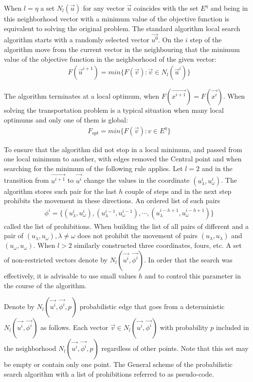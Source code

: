 \documentclass[]{TAACpaper}
\begin{document}
When $l=\eta$ a set $ N_l(\vec{u})$ for any vector $\vec{u}$ coincides with the set $E^{\eta}$ and being in this neighborhood vector with a minimum value of the objective function is equivalent to solving the original problem. The standard algorithm local search algorithm starts with a randomly selected vector $\vec{u^0}$.
On the $i$ step of the algorithm move from the current vector in the neighbouring that the minimum value of the objective function in the neighborhood of the given vector:
\begin{align} 
& F(\vec{u}^{i+1})=min\{F(\vec{v}):\vec{v} \in N_l(\vec{u}^i)\}
\end{align}	

The algorithm terminates at a local optimum, when $F(\vec{x^{i+1}})=F(\vec{x^i})$. When solving the transportation problem is a typical situation when many local optimums and only one of them is global:
\begin{align} 
& F_{opt}=min\{F(\vec{v}):v \in E^{\eta}\}
\end{align}	

To ensure that the algorithm did not stop in a local minimum, and passed from one local minimum to another, with edges removed the Central point and when searching for the minimum of the following rule applies. Let $l=2$ and in the transition from $\vec{u^{i+1}}$ to $\vec{u^i}$ change the values in the coordinate $(u_\lambda^{i}, u_\omega^{i})$. The algorithm stores such pair for the last $h$ couple of steps and in the next step prohibits the movement in these directions. An ordered list of such pairs
\begin{align} 
& \phi^i=\{(u_\lambda^{i},u_\omega^{i}),(u_\lambda^{i-1},u_\omega^{i-1}),\cdots,(u_\lambda^{i-h+1},u_\omega^{i-h+1}) \} 
\end{align}	
called the list of prohibitions. When building the list of all pairs of different and a pair of $(u_\lambda,u_\omega),\lambda \ne \omega$ does not prohibit the movement of pairs $(u_\lambda,u_\lambda)$ and $(u_\omega,u_\omega)$. When $l>2$ similarly constructed three coordinates, fours, etc. A set of non-restricted vectors denote by $N_l(\vec{u^i},\vec{\phi^i})$. In order that the search was effectively, it is advisable to use small values $h$ and to control this parameter in the course of the algorithm.

Denote by $N_l(\vec{u^i},\vec{\phi^i},p)$ probabilistic edge that goes from a deterministic $N_l(\vec{u^i},\vec{\phi^i})$ as follows. Each vector $\vec{v} \in N_l(\vec{u^i},\vec{\phi^i})$ with probability $p$ included in the neighborhood $N_l(\vec{u^i},\vec{\phi^i},p)$ regardless of other points. Note that this set may be empty or contain only one point. The General scheme of the probabilistic search algorithm with a list of prohibitions referred to as pseudo-code.
\end{document}
